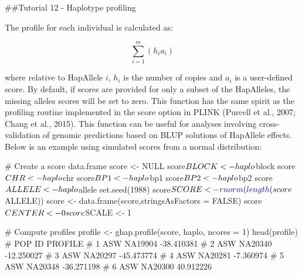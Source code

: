 \documentclass[
]{article}
\newenvironment{Shaded}{}{}
\newcommand{\CommentTok}[1]{\textcolor[rgb]{0.00,0.50,0.00}{#1}}
\newcommand{\DataTypeTok}[1]{#1}
\newcommand{\DecValTok}[1]{#1}
\newcommand{\KeywordTok}[1]{\textcolor[rgb]{0.00,0.00,1.00}{#1}}
\newcommand{\NormalTok}[1]{#1}
\newcommand{\OperatorTok}[1]{#1}
\newcommand{\OtherTok}[1]{\textcolor[rgb]{1.00,0.25,0.00}{#1}}
\newcommand{\StringTok}[1]{\textcolor[rgb]{0.00,0.50,0.50}{#1}}
\begin{document}
\pagebreak

\#\#Tutorial 12 - Haplotype profiling

The profile for each individual is calculated as:

\[\sum_{i=1}^{m}(h_ia_i)\]

where relative to HapAllele \(i\), \(h_i\) is the number of copies and
\(a_i\) is a user-defined score. By default, if scores are provided for
only a subset of the HapAlleles, the missing alleles scores will be set
to zero. This function has the same spirit as the profiling routine
implemented in the score option in PLINK (Purcell et al., 2007; Chang et
al., 2015). This function can be useful for analyses involving
cross-validation of genomic predictions based on BLUP solutions of
HapAllele effects. Below is an example using simulated scores from a
normal distribution:

\begin{Shaded}
\begin{Highlighting}[]
\CommentTok{# Create a score data.frame}
\NormalTok{score <-}\StringTok{ }\OtherTok{NULL}
\NormalTok{score}\OperatorTok{$}\NormalTok{BLOCK <-}\StringTok{ }\NormalTok{haplo}\OperatorTok{$}\NormalTok{block}
\NormalTok{score}\OperatorTok{$}\NormalTok{CHR <-}\StringTok{ }\NormalTok{haplo}\OperatorTok{$}\NormalTok{chr}
\NormalTok{score}\OperatorTok{$}\NormalTok{BP1 <-}\StringTok{ }\NormalTok{haplo}\OperatorTok{$}\NormalTok{bp1}
\NormalTok{score}\OperatorTok{$}\NormalTok{BP2 <-}\StringTok{ }\NormalTok{haplo}\OperatorTok{$}\NormalTok{bp2}
\NormalTok{score}\OperatorTok{$}\NormalTok{ALLELE <-}\StringTok{ }\NormalTok{haplo}\OperatorTok{$}\NormalTok{allele}
\KeywordTok{set.seed}\NormalTok{(}\DecValTok{1988}\NormalTok{)}
\NormalTok{score}\OperatorTok{$}\NormalTok{SCORE <-}\StringTok{ }\KeywordTok{rnorm}\NormalTok{(}\KeywordTok{length}\NormalTok{(score}\OperatorTok{$}\NormalTok{ALLELE))}
\NormalTok{score <-}\StringTok{ }\KeywordTok{data.frame}\NormalTok{(score,}\DataTypeTok{stringsAsFactors =} \OtherTok{FALSE}\NormalTok{)}
\NormalTok{score}\OperatorTok{$}\NormalTok{CENTER <-}\StringTok{ }\DecValTok{0}
\NormalTok{score}\OperatorTok{$}\NormalTok{SCALE <-}\StringTok{ }\DecValTok{1}

\CommentTok{# Compute profiles}
\NormalTok{profile <-}\StringTok{ }\KeywordTok{ghap.profile}\NormalTok{(score, haplo, }\DataTypeTok{ncores =} \DecValTok{1}\NormalTok{)}
\KeywordTok{head}\NormalTok{(profile)}
\CommentTok{#     POP      ID    PROFILE}
\CommentTok{#   1 ASW NA19904 -38.410381}
\CommentTok{#   2 ASW NA20340 -12.250027}
\CommentTok{#   3 ASW NA20297 -45.473774}
\CommentTok{#   4 ASW NA20281  -7.360974}
\CommentTok{#   5 ASW NA20348 -36.271198}
\CommentTok{#   6 ASW NA20300  40.912226}
\end{Highlighting}
\end{Shaded}
\end{document}
